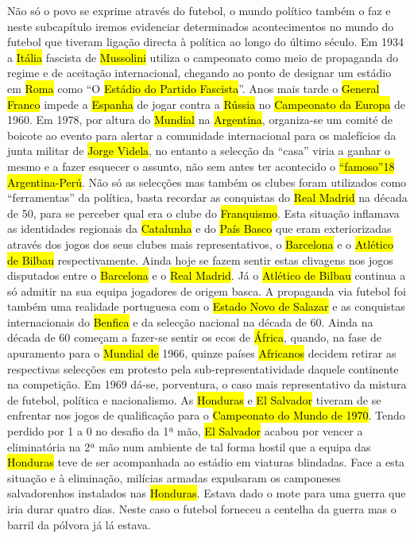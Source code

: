 \documentclass[a4paper,12pt]{article}
\begin{document}
 Não só o povo se exprime através do futebol, o mundo político também o faz e neste subcapítulo iremos evidenciar determinados acontecimentos no mundo do futebol que tiveram ligação directa à política ao longo do último século.
 Em 1934 a \hl{Itália} fascista de \hl{Mussolini} utiliza o campeonato como meio de propaganda do regime e de aceitação internacional, chegando ao ponto de designar um estádio em \hl{Roma} como “O \hl{Estádio do Partido Fascista}”. Anos mais tarde o \hl{General Franco} impede a \hl{Espanha} de jogar contra a \hl{Rússia} no \hl{Campeonato da Europa} de 1960. Em 1978, por altura do \hl{Mundial} na \hl{Argentina}, organiza-se um comité de boicote ao evento para alertar a comunidade internacional para os malefícios da junta militar de \hl{Jorge Videla}, no
 entanto a selecção da “casa” viria a ganhar o mesmo e a fazer esquecer o assunto, não sem antes ter acontecido o \hl{“famoso”18 Argentina-Perú}.
 Não só as selecções mas também os clubes foram utilizados como “ferramentas” da política, basta recordar as conquistas do \hl{Real Madrid} na década de 50, para se perceber qual era o clube do \hl{Franquismo}. Esta situação inflamava as identidades regionais da \hl{Catalunha} e do \hl{País Basco} que eram exteriorizadas através dos jogos dos seus clubes mais representativos, o \hl{Barcelona} e o \hl{Atlético de Bilbau} respectivamente. Ainda hoje se fazem sentir estas clivagens nos jogos disputados entre o \hl{Barcelona} e o \hl{Real Madrid}. Já o \hl{Atlético de Bilbau} continua a só admitir na sua equipa jogadores de origem basca.
 A propaganda via futebol foi também uma realidade portuguesa com o \hl{Estado Novo de Salazar} e as conquistas internacionais do \hl{Benfica} e da selecção nacional na década de 60.
 Ainda na década de 60 começam a fazer-se sentir os ecos de \hl{África}, quando, na fase de apuramento para o \hl{Mundial de} 1966, quinze países \hl{Africanos} decidem retirar as respectivas selecções em protesto pela sub-representatividade daquele continente na competição.
 Em 1969 dá-se, porventura, o caso mais representativo da mistura de futebol, política e nacionalismo. As \hl{Honduras} e \hl{El Salvador} tiveram de se enfrentar nos jogos de qualificação para o \hl{Campeonato do Mundo de 1970}. Tendo perdido por 1 a 0 no desafio da 1ª mão, \hl{El Salvador} acabou por vencer a eliminatória na 2ª mão num ambiente de tal forma hostil que a equipa das \hl{Honduras} teve de ser acompanhada ao estádio em viaturas blindadas. Face a esta situação e à eliminação, milícias armadas expulsaram os camponeses salvadorenhos instalados nas \hl{Honduras}. Estava dado o mote para uma guerra que iria durar quatro dias. Neste caso o futebol forneceu a centelha da guerra mas o barril da pólvora já lá estava.
\end{document}
